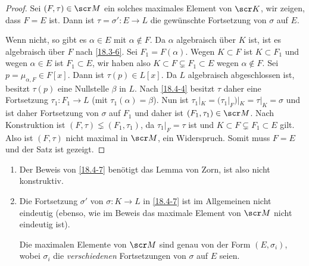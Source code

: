 \begin{st}[Fortsetzungsatz]
\begin{proof}
		Sei $(F, \tau) \in \scr M$ ein solches maximales Element von $\scr K$, wir zeigen, dass $F = E$ ist.
		Dann ist $\tau = \sigma': E \to L$ die gewünschte Fortsetzung von $\sigma$ auf $E$.

		Wenn nicht, so gibt es $\alpha \in E$ mit $\alpha \not\in F$.
		Da $\alpha$ algebraisch über $K$ ist, ist es algebraisch über $F$ nach \ref{18.3-6}.
		Sei $F_1 = F(\alpha)$.
		Wegen $K \subset F$ ist $K \subset F_1$ und wegen $\alpha \in E$ ist $F_1 \subset E$, wir haben also $K \subset F \subsetneq F_1 \subset E$ wegen $\alpha \not\in F$.
		Sei $p = \mu_{\alpha, F} \in F[x]$.
		Dann ist $\tau(p) \in L[x]$.
		Da $L$ algebraisch abgeschlossen ist, besitzt $\tau(p)$ eine Nullstelle $\beta$ in $L$.
		Nach \ref{18.4-4} besitzt $\tau$ daher eine Fortsetzung $\tau_1: F_1 \to L$ (mit $\tau_1(\alpha) = \beta$).
		Nun ist $\tau_1|_K = (\tau_1|_F)|_K = \tau|_K = \sigma$ und ist daher Fortsetzung von $\sigma$ auf $F_1$ und daher ist $(F_1, \tau_1) \in \scr M$.
		Nach Konstruktion ist $(F, \tau) \lneq (F_1, \tau_1)$, da $\tau_1|_F = \tau$ ist und $K \subset F \subsetneq F_1 \subset E$ gilt.
		Also ist $(F, \tau)$ nicht maximal in $\scr M$, ein Widerspruch.
		Somit muss $F = E$ und der Satz ist gezeigt.

	\end{proof}
\end{st}

\begin{nt} \label{18.4-8}
	\begin{enumerate}[1.)]
		\item
			Der Beweis von \ref{18.4-7} benötigt das Lemma von Zorn, ist also nicht konstruktiv.
		\item
			Die Fortsetzung $\sigma'$ von $\sigma: K \to L$ in \ref{18.4-7} ist im Allgemeinen nicht eindeutig (ebenso, wie im Beweis das maximale Element von $\scr M$ nicht eindeutig ist).

			Die maximalen Elemente von $\scr M$ sind genau von der Form $(E, \sigma_i)$, wobei $\sigma_i$ die \emph{verschiedenen} Fortsetzungen von $\sigma$ auf $E$ seien.
	\end{enumerate}
\end{nt}

